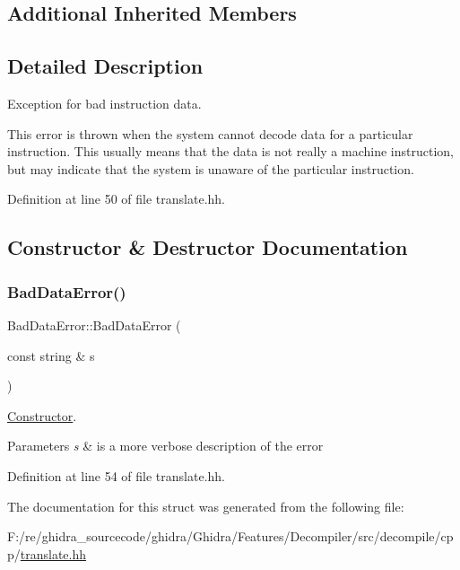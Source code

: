 \subsection*{Additional Inherited Members}


\subsection{Detailed Description}
Exception for bad instruction data. 

This error is thrown when the system cannot decode data for a particular instruction. This usually means that the data is not really a machine instruction, but may indicate that the system is unaware of the particular instruction. 

Definition at line 50 of file translate.\+hh.



\subsection{Constructor \& Destructor Documentation}
\mbox{\label{struct_bad_data_error_af658d0dd218fe979c377738d0e5ed9ff}} 
\subsubsection{\texorpdfstring{BadDataError()}{BadDataError()}}
{\footnotesize\ttfamily Bad\+Data\+Error\+::\+Bad\+Data\+Error (\begin{DoxyParamCaption}\item[{const string \&}]{s }\end{DoxyParamCaption})\hspace{0.3cm}{\ttfamily [inline]}}



\mbox{\hyperlink{class_constructor}{Constructor}}. 


\begin{DoxyParams}{Parameters}
{\em s} & is a more verbose description of the error \\
\hline
\end{DoxyParams}


Definition at line 54 of file translate.\+hh.



The documentation for this struct was generated from the following file\+:\begin{DoxyCompactItemize}
\item 
F\+:/re/ghidra\+\_\+sourcecode/ghidra/\+Ghidra/\+Features/\+Decompiler/src/decompile/cpp/\mbox{\hyperlink{translate_8hh}{translate.\+hh}}\end{DoxyCompactItemize}
